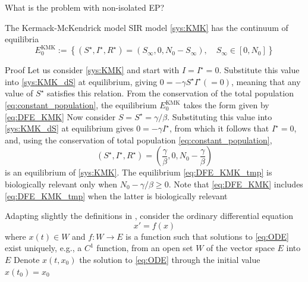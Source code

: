 \documentclass[aspectratio=169]{beamer}\usepackage[]{graphicx}\usepackage[]{xcolor}
\begin{document}
\begin{frame}{What is the problem with non-isolated EP?}
\begin{proposition}\label{prop:EP_KMK}
The Kermack-McKendrick model SIR model \eqref{sys:KMK} has the continuum of equilibria
\begin{equation}
\label{eq:DFE_KMK}
    E_0^\text{KMK}:=\left\{
    (S^\star,I^\star,R^\star)=(S_\infty,0,N_0-S_\infty),\quad S_\infty\in[0,N_0]
    \right\}
\end{equation}
\end{proposition}
\end{frame}

\begin{frame}{Proof}
Let us consider \eqref{sys:KMK} and start with $I=I^\star=0$.
Substitute this value into \eqref{sys:KMK_dS} at equilibrium, giving $0 = -\gamma S^\star I^\star(=0)$, meaning that any value of $S^\star$ satisfies this relation. From the conservation of the total population \eqref{eq:constant_population}, the equilibrium $E_0^\text{KMK}$ takes the form given by \eqref{eq:DFE_KMK}
\vfill
Now consider $S=S^\star=\gamma/\beta$. Substituting this value into \eqref{sys:KMK_dS} at equilibrium gives $0 = -\gamma I^\star$, from which it follows that $I^\star=0$, and, using the conservation of total population \eqref{eq:constant_population},
\begin{equation}\label{eq:DFE_KMK_tmp}
    (S^\star,I^\star,R^\star)=\left(
    \frac{\gamma}{\beta},0,N_0-\frac{\gamma}{\beta}
    \right)
\end{equation}
is an equilibrium of \eqref{sys:KMK}. 
The equilibrium \eqref{eq:DFE_KMK_tmp} is biologically relevant only when $N_0-\gamma/\beta\geq 0$.
Note that \eqref{eq:DFE_KMK} includes \eqref{eq:DFE_KMK_tmp} when the latter is biologically relevant
\end{frame}

\begin{frame}
Adapting slightly the definitions in \cite{HirschSmale1974}, consider the ordinary differential equation
\begin{equation}\label{eq:ODE}
    x' = f(x)
\end{equation}
where $x(t)\in W$ and $f:W\to E$ is a function such that solutions to \eqref{eq:ODE} exist uniquely, e.g., a $C^1$ function, from an open set $W$ of the vector space $E$ into $E$
\vfill
Denote $x(t,x_0)$ the solution to \eqref{eq:ODE} through the initial value $x(t_0)=x_0$
\end{frame}
\end{document}
